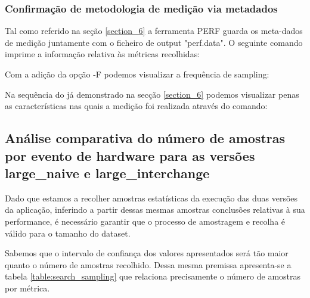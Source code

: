 \documentclass[conference,compsoc]{IEEEtran}
\begin{document}
  \subsubsection{Confirmação de metodologia de medição via metadados}

  Tal como referido na seção \ref{section_6} a ferramenta PERF guarda os meta-dados de medição juntamente com o ficheiro de output "perf.data". O seguinte comando imprime a informação relativa às métricas recolhidas:



  Com a adição da opção -F podemos visualizar a frequência de sampling:



  Na sequência do já demonstrado na secção \ref{section_6} podemos visualizar penas as características nas quais a medição foi realizada através do comando:




  \subsection{Análise comparativa do número de amostras por evento de hardware para as versões large\_naive e large\_interchange}

  Dado que estamos a recolher amostras estatísticas da execução das duas versões da aplicação, inferindo a partir dessas mesmas amostras conclusões relativas à sua performance, é necessário garantir que o processo de amostragem e recolha é válido para o tamanho do dataset. \par 
  Sabemos que o intervalo de confiança dos valores apresentados será tão maior quanto o número de amostras recolhido. Dessa mesma premissa apresenta-se a tabela \ref{table:search_sampling} que relaciona precisamente o número de amostras por métrica. \par 
\end{document}
